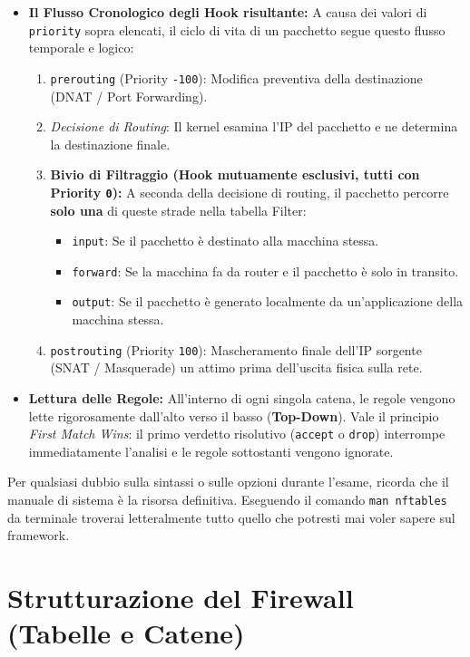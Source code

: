 \documentclass[12pt,a4paper]{report}
\begin{document}
\begin{itemize}
		\item \textbf{Il Flusso Cronologico degli Hook risultante:} A causa dei valori di \texttt{priority} sopra elencati, il ciclo di vita di un pacchetto segue questo flusso temporale e logico:
		\begin{enumerate}
			\item \texttt{prerouting} (Priority \texttt{-100}): Modifica preventiva della destinazione (DNAT / Port Forwarding).
			\item \textit{Decisione di Routing}: Il kernel esamina l'IP del pacchetto e ne determina la destinazione finale.
			\item \textbf{Bivio di Filtraggio (Hook mutuamente esclusivi, tutti con Priority \texttt{0}):} A seconda della decisione di routing, il pacchetto percorre \textbf{solo una} di queste strade nella tabella Filter:
			\begin{itemize}
				\item \texttt{input}: Se il pacchetto è destinato alla macchina stessa.
				\item \texttt{forward}: Se la macchina fa da router e il pacchetto è solo in transito.
				\item \texttt{output}: Se il pacchetto è generato localmente da un'applicazione della macchina stessa.
			\end{itemize}
			\item \texttt{postrouting} (Priority \texttt{100}): Mascheramento finale dell'IP sorgente (SNAT / Masquerade) un attimo prima dell'uscita fisica sulla rete.
		\end{enumerate}
		
		\item \textbf{Lettura delle Regole:} All'interno di ogni singola catena, le regole vengono lette rigorosamente dall'alto verso il basso (\textbf{Top-Down}). Vale il principio \textit{First Match Wins}: il primo verdetto risolutivo (\texttt{accept} o \texttt{drop}) interrompe immediatamente l'analisi e le regole sottostanti vengono ignorate.
	\end{itemize}
	
	\begin{nota}
		Per qualsiasi dubbio sulla sintassi o sulle opzioni durante l'esame, ricorda che il manuale di sistema è la risorsa definitiva. Eseguendo il comando \texttt{man nftables} da terminale troverai letteralmente tutto quello che potresti mai voler sapere sul framework.
	\end{nota}
	
	\section{Strutturazione del Firewall (Tabelle e Catene)}
	
\end{document}
